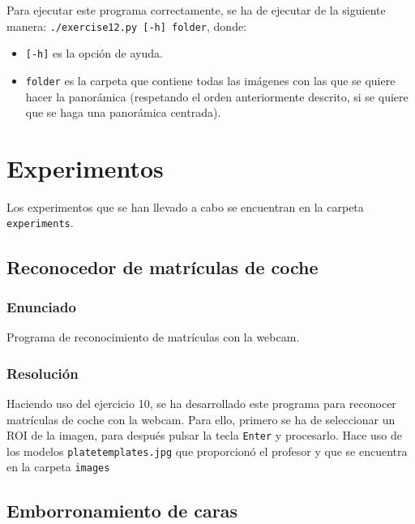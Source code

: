 \documentclass[a4paper,10pt,titlepage,oneside,openright]{book}
\begin{document}
Para ejecutar este programa correctamente, se ha de ejecutar de la siguiente manera: \texttt{./exercise12.py [-h] folder}, donde:
\begin{itemize}
 \item \texttt{[-h]} es la opción de ayuda.
 \item \texttt{folder} es la carpeta que contiene todas las imágenes con las que se quiere hacer la panorámica (respetando el orden anteriormente descrito, si se quiere que se haga una panorámica centrada).
\end{itemize}




\medskip
\section{Experimentos}
Los experimentos que se han llevado a cabo se encuentran en la carpeta \texttt{experiments}.

\medskip
\subsection{Reconocedor de matrículas de coche}

\subsubsection*{Enunciado}
Programa de reconocimiento de matrículas con la webcam.

\subsubsection*{Resolución}
Haciendo uso del ejercicio 10, se ha desarrollado este programa para reconocer matrículas de coche con la webcam. Para ello, primero se ha de seleccionar un ROI de la imagen, para después pulsar la tecla \texttt{Enter} y procesarlo. Hace uso de los modelos \texttt{platetemplates.jpg} que proporcionó el profesor y que se encuentra en la carpeta \texttt{images}



\medskip
\subsection{Emborronamiento de caras}
\end{document}
